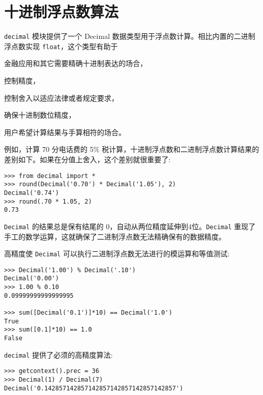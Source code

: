 \section{十进制浮点数算法}
\texttt{decimal} 模块提供了一个 Decimal 数据类型用于浮点数计算。相比内置的二进制浮点数实现 \texttt{float}，这个类型有助于
\begin{compactitem}
    \item 金融应用和其它需要精确十进制表达的场合，
    \item 控制精度，
    \item 控制舍入以适应法律或者规定要求，
    \item 确保十进制数位精度，
    \item 用户希望计算结果与手算相符的场合。
\end{compactitem}
例如，计算 70 分电话费的 5\% 税计算，十进制浮点数和二进制浮点数计算结果的差别如下。如果在分值上舍入，这个差别就很重要了:
\begin{lstlisting}
>>> from decimal import *
>>> round(Decimal('0.70') * Decimal('1.05'), 2)
Decimal('0.74')
>>> round(.70 * 1.05, 2)
0.73
\end{lstlisting}
\texttt{Decimal} 的结果总是保有结尾的 0，自动从两位精度延伸到4位。\texttt{Decimal} 重现了手工的数学运算，这就确保了二进制浮点数无法精确保有的数据精度。

高精度使 \texttt{Decimal} 可以执行二进制浮点数无法进行的模运算和等值测试:
\begin{lstlisting}
>>> Decimal('1.00') % Decimal('.10')
Decimal('0.00')
>>> 1.00 % 0.10
0.09999999999999995

>>> sum([Decimal('0.1')]*10) == Decimal('1.0')
True
>>> sum([0.1]*10) == 1.0
False
\end{lstlisting}
\texttt{decimal} 提供了必须的高精度算法:
\begin{lstlisting}
>>> getcontext().prec = 36
>>> Decimal(1) / Decimal(7)
Decimal('0.142857142857142857142857142857142857')
\end{lstlisting} 